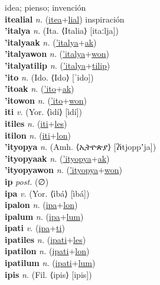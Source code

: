 idea; pienso; invención \label{itealon} \\
\textbf{itealial} \textit{n.} (\hyperref[itea]{itea}+\hyperref[lial]{lial})
inspiración \label{itealial} \\
\textbf{'italya} \textit{n.} (Ita. ⟨Italia⟩ [itaːlja])
 \label{'italya} \\
\textbf{'italyaak} \textit{n.} (\hyperref['italya]{'italya}+\hyperref[ak]{ak})
 \label{'italyaak} \\
\textbf{'italyawon} \textit{n.} (\hyperref['italya]{'italya}+\hyperref[won]{won})
 \label{'italyawon} \\
\textbf{'italyatilip} \textit{n.} (\hyperref['italya]{'italya}+\hyperref[tilip]{tilip})
 \label{'italyatilip} \\
\textbf{'ito} \textit{n.} (Ido. ⟨Ido⟩ [ˈido])
 \label{'ito} \\
\textbf{'itoak} \textit{n.} (\hyperref['ito]{'ito}+\hyperref[ak]{ak})
 \label{'itoak} \\
\textbf{'itowon} \textit{n.} (\hyperref['ito]{'ito}+\hyperref[won]{won})
 \label{'itowon} \\
\textbf{iti} \textit{v.} (Yor. ⟨ìdí⟩ [ìdí])
 \label{iti} \\
\textbf{itiles} \textit{n.} (\hyperref[iti]{iti}+\hyperref[les]{les})
 \label{itiles} \\
\textbf{itilon} \textit{n.} (\hyperref[iti]{iti}+\hyperref[lon]{lon})
 \label{itilon} \\
\textbf{'ityopya} \textit{n.} (Amh. ⟨ኢትዮጵያ⟩ [ʔɨtjoppʼja])
 \label{'ityopya} \\
\textbf{'ityopyaak} \textit{n.} (\hyperref['ityopya]{'ityopya}+\hyperref[ak]{ak})
 \label{'ityopyaak} \\
\textbf{'ityopyawon} \textit{n.} (\hyperref['ityopya]{'ityopya}+\hyperref[won]{won})
 \label{'ityopyawon} \\
\textbf{ip} \textit{post.} (∅)
 \label{ip} \\
\textbf{ipa} \textit{v.} (Yor. ⟨ìbá⟩ [ìbá])
 \label{ipa} \\
\textbf{ipalon} \textit{n.} (\hyperref[ipa]{ipa}+\hyperref[lon]{lon})
 \label{ipalon} \\
\textbf{ipalum} \textit{n.} (\hyperref[ipa]{ipa}+\hyperref[lum]{lum})
 \label{ipalum} \\
\textbf{ipati} \textit{v.} (\hyperref[ipa]{ipa}+\hyperref[ti]{ti})
 \label{ipati} \\
\textbf{ipatiles} \textit{n.} (\hyperref[ipati]{ipati}+\hyperref[les]{les})
 \label{ipatiles} \\
\textbf{ipatilon} \textit{n.} (\hyperref[ipati]{ipati}+\hyperref[lon]{lon})
 \label{ipatilon} \\
\textbf{ipatilum} \textit{n.} (\hyperref[ipati]{ipati}+\hyperref[lum]{lum})
 \label{ipatilum} \\
\textbf{ipis} \textit{n.} (Fil. ⟨ipis⟩ [ipis])
 \label{ipis} 

